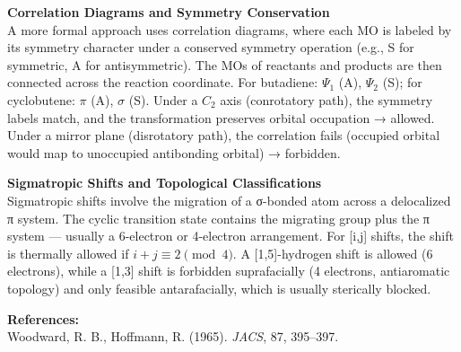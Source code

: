 \begin{technical}
\noindent\textbf{Correlation Diagrams and Symmetry Conservation}\\[0.3em]
A more formal approach uses correlation diagrams, where each MO is labeled by its symmetry character under a conserved symmetry operation (e.g., S for symmetric, A for antisymmetric). The MOs of reactants and products are then connected across the reaction coordinate. For butadiene: \(\Psi_1\) (A), \(\Psi_2\) (S); for cyclobutene: \(\pi\) (A), \(\sigma\) (S). Under a \( C_2 \) axis (conrotatory path), the symmetry labels match, and the transformation preserves orbital occupation → allowed. Under a mirror plane (disrotatory path), the correlation fails (occupied orbital would map to unoccupied antibonding orbital) → forbidden.

\noindent\textbf{Sigmatropic Shifts and Topological Classifications}\\[0.3em]
Sigmatropic shifts involve the migration of a σ-bonded atom across a delocalized π system. The cyclic transition state contains the migrating group plus the π system — usually a 6-electron or 4-electron arrangement. For [i,j] shifts, the shift is thermally allowed if \(i + j \equiv 2 \pmod{4}\). A [1,5]-hydrogen shift is allowed (6 electrons), while a [1,3] shift is forbidden suprafacially (4 electrons, antiaromatic topology) and only feasible antarafacially, which is usually sterically blocked.

\vspace{0.3em}
\noindent\textbf{References:}\\
Woodward, R. B., Hoffmann, R. (1965). \textit{JACS}, 87, 395–397.\\
\end{technical}
